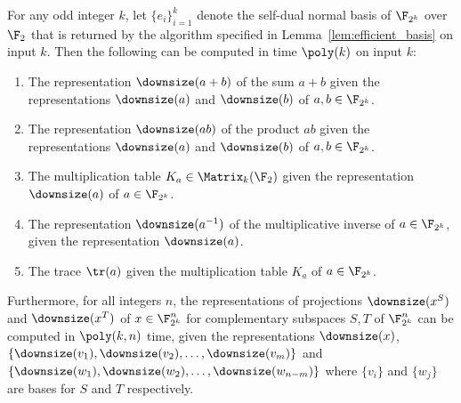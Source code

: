 \begin{lemma}
  \label{lem:efficient_arithmetic}
  For any odd integer $k$, let $\{e_i\}_{i=1}^k$ denote the self-dual normal basis
  of $\F_{2^k}$ over $\F_2$ that is returned by the algorithm specified in
  Lemma~\ref{lem:efficient_basis} on input $k$.
  Then the following can be computed in time $\poly(k)$ on input $k$:
  \begin{enumerate}
  \item The representation $\downsize(a+b)$ of the sum $a+b$ given the
    representations $\downsize(a)$ and $\downsize(b)$ of $a, b \in \F_{2^k}$.
	\item The representation $\downsize(ab)$ of the product $ab$ given the
    representations $\downsize(a)$ and $\downsize(b)$ of $a, b \in \F_{2^k}$.
  \item The multiplication table $K_a \in \Matrix_k(\F_2)$ given the
    representation $\downsize(a)$ of  $a\in \F_{2^k}$.
  \item The representation $\downsize(a^{-1})$ of the multiplicative inverse of
    $a \in \F_{2^k}$, given the representation $\downsize(a)$.
	\item The trace $\tr(a)$ given the multiplication table $K_a$ of $a \in \F_{2^k}$.
  \end{enumerate}
  Furthermore, for all integers $n$, the representations of projections
  $\downsize(x^S)$ and $\downsize(x^T)$ of $x \in \F_{2^k}^n$ for complementary
  subspaces $S,T$ of $\F_{2^k}^n$ can be computed in $\poly(k,n)$ time, given
  the representations $\downsize(x)$, $\{\downsize(v_1), \downsize(v_2), \ldots,
  \downsize(v_m)\}$ and $\{\downsize(w_1), \downsize(w_2), \ldots,
  \downsize(w_{n - m})\}$ where $\{v_i\}$ and $\{w_j\}$ are bases for $S$ and
  $T$ respectively.
\end{lemma}

